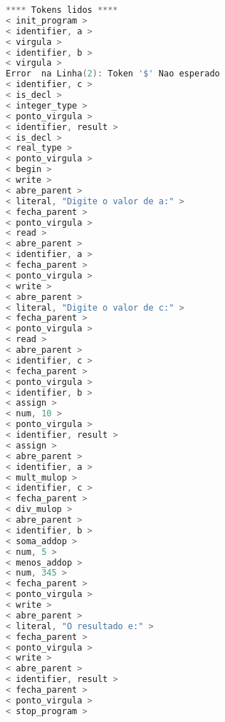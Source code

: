 \begin{lstlisting}[caption={Saida Correta para o Codigo de teste  : Teste1.txt},label={Entrada 1},language=C]
**** Tokens lidos ****
< init_program >
< identifier, a >
< virgula >      
< identifier, b >
< virgula >
Error  na Linha(2): Token '$' Nao esperado
< identifier, c >
< is_decl >
< integer_type >
< ponto_virgula >
< identifier, result >
< is_decl >
< real_type >
< ponto_virgula >
< begin >
< write >
< abre_parent >
< literal, "Digite o valor de a:" >
< fecha_parent >
< ponto_virgula >
< read >
< abre_parent >
< identifier, a >
< fecha_parent >
< ponto_virgula >
< write >
< abre_parent >
< literal, "Digite o valor de c:" >
< fecha_parent >
< ponto_virgula >
< read >
< abre_parent >
< identifier, c >
< fecha_parent >
< ponto_virgula >
< identifier, b >
< assign >
< num, 10 >
< ponto_virgula >
< identifier, result >
< assign >
< abre_parent >
< identifier, a >
< mult_mulop >
< identifier, c >
< fecha_parent >
< div_mulop >
< abre_parent >
< identifier, b >
< soma_addop >
< num, 5 >
< menos_addop >
< num, 345 >
< fecha_parent >
< ponto_virgula >
< write >
< abre_parent >
< literal, "O resultado e:" >
< fecha_parent >
< ponto_virgula >
< write >
< abre_parent >
< identifier, result >
< fecha_parent >
< ponto_virgula >
< stop_program >




\end{lstlisting}
